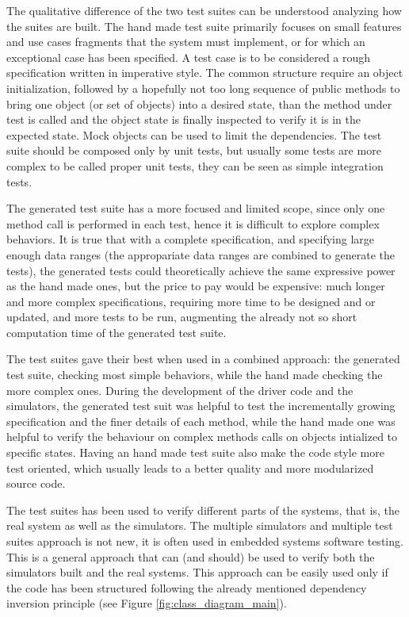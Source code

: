 \documentclass{article} \usepackage{times}
\begin{document}
The qualitative difference of the two test suites can be understood
analyzing how the suites are built. The hand made test suite primarily
focuses on small features and use cases fragments that the system must
implement, or for which an exceptional case has been specified. A test
case is to be considered a rough specification written in imperative
style. The common structure require an object initialization, followed
by a hopefully not too long sequence of public methods to bring one
object (or set of objects) into a desired state, than the method under
test is called and the object state is finally inspected to verify it
is in the expected state. Mock objects can be used to limit the
dependencies. The test suite should be composed only by unit tests,
but usually some tests are more complex to be called proper unit
tests, they can be seen as simple integration tests.

The generated test suite has a more focused and limited scope, since
only one method call is performed in each test, hence it is difficult
to explore complex behaviors. It is true that with a complete
specification, and specifying large enough data ranges (the
appropariate data ranges are combined to generate the tests), the
generated tests could theoretically achieve the same expressive power
as the hand made ones, but the price to pay would be expensive: much
longer and more complex specifications, requiring more time to be
designed and or updated, and more tests to be run, augmenting the
already not so short computation time of the generated test suite.

The test suites gave their best when used in a combined approach: the
generated test suite, checking most simple behaviors, while the hand
made checking the more complex ones.  During the development of the
driver code and the simulators, the generated test suit was helpful to
test the incrementally growing specification and the finer details of
each method, while the hand made one was helpful to verify the
behaviour on complex methods calls on objects intialized to specific
states. Having an hand made test suite also make the code style more
test oriented, which usually leads to a better quality and more
modularized source code\cite{Binder1999}.

The test suites has been used to verify different parts of the
systems, that is, the real system as well as the simulators.  The
multiple simulators and multiple test suites approach is not new, it
is often used in embedded systems software testing\cite{Broekman2002}.
This is a general approach that can (and should) be used to verify
both the simulators built and the real systems.  This approach can be
easily used only if the code has been structured following the already
mentioned dependency inversion principle\cite{martin1996dependency}
(see Figure \ref{fig:class_diagram_main}).
\end{document}
